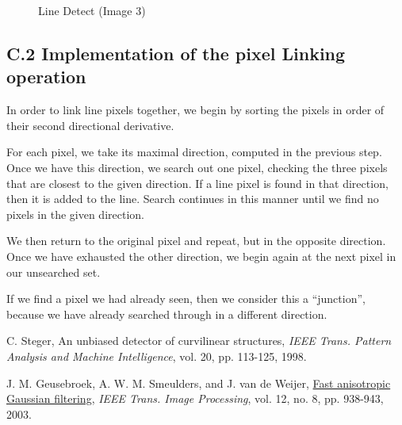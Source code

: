 \documentclass{article}
\begin{document}
\begin{figure}[h]
\begin{minipage}[b]{0.3\linewidth}
\caption{Line Detect (Image 3)}
\label{fig:line_detect_3}
\end{minipage}
\end{figure}


\pagebreak
\subsection*{C.2 Implementation of the pixel Linking operation}

In order to link line pixels together, we begin by sorting the pixels in order of their second directional derivative.

For each pixel, we take its maximal direction, computed in the previous step. Once we have this direction, we search out one pixel, checking the three pixels that are closest to the given direction. If a line pixel is found in that direction, then it is added to the line. Search continues in this manner until we find no pixels in the given direction.

We then return to the original pixel and repeat, but in the opposite direction. Once we have exhausted the other direction, we begin again at the next pixel in our unsearched set.

If we find a pixel we had already seen, then we consider this a ``junction'', because we have already searched through in a different direction.


\pagebreak
\begin{thebibliography}{9}
\fontsize{10pt}{12pt}\selectfont
\raggedright

        C. Steger, An unbiased detector of curvilinear structures, 
        \emph{IEEE Trans. Pattern Analysis and Machine Intelligence},
        vol. 20, pp. 113-125, 1998.

        J. M. Geusebroek, A. W. M. Smeulders, and J. van de Weijer, 
        \ul{Fast anisotropic Gaussian filtering},
        \emph{IEEE Trans. Image Processing}, vol. 12, no. 8, pp. 938-943, 2003.


\end{thebibliography}


\end{document}
